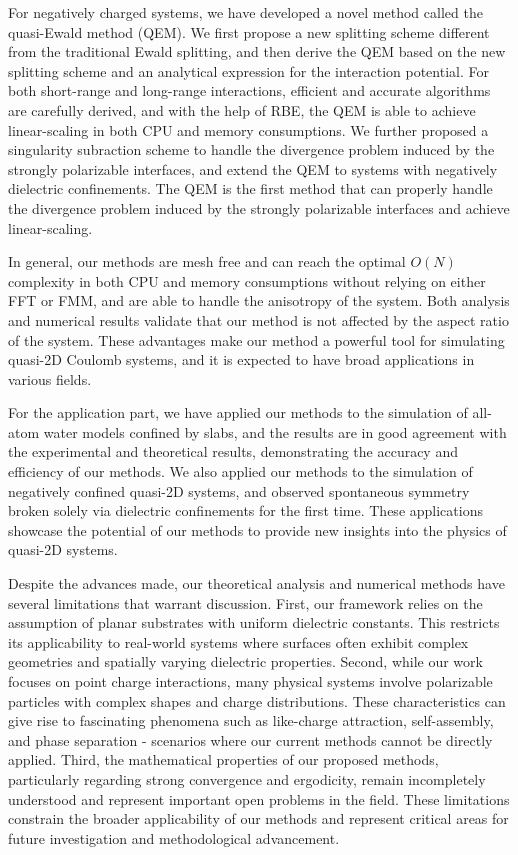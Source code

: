 For negatively charged systems, we have developed a novel method called the quasi-Ewald method (QEM).
We first propose a new splitting scheme different from the traditional Ewald splitting, and then derive the QEM based on the new splitting scheme and an analytical expression for the interaction potential.
For both short-range and long-range interactions, efficient and accurate algorithms are carefully derived, and with the help of RBE, the QEM is able to achieve linear-scaling in both CPU and memory consumptions.
We further proposed a singularity subraction scheme to handle the divergence problem induced by the strongly polarizable interfaces, and extend the QEM to systems with negatively dielectric confinements.
The QEM is the first method that can properly handle the divergence problem induced by the strongly polarizable interfaces and achieve linear-scaling.


In general, our methods are mesh free and can reach the optimal $O(N)$ complexity in both CPU and memory consumptions without relying on either FFT or FMM, and are able to handle the anisotropy of the system.
Both analysis and numerical results validate that our method is not affected by the aspect ratio of the system.
These advantages make our method a powerful tool for simulating quasi-2D Coulomb systems, and it is expected to have broad applications in various fields.

For the application part, we have applied our methods to the simulation of all-atom water models confined by slabs, and the results are in good agreement with the experimental and theoretical results, demonstrating the accuracy and efficiency of our methods.
We also applied our methods to the simulation of negatively confined quasi-2D systems, and observed spontaneous symmetry broken solely via dielectric confinements for the first time.
These applications showcase the potential of our methods to provide new insights into the physics of quasi-2D systems.

Despite the advances made, our theoretical analysis and numerical methods have several limitations that warrant discussion.
First, our framework relies on the assumption of planar substrates with uniform dielectric constants.
This restricts its applicability to real-world systems where surfaces often exhibit complex geometries and spatially varying dielectric properties.
Second, while our work focuses on point charge interactions, many physical systems involve polarizable particles with complex shapes and charge distributions.
These characteristics can give rise to fascinating phenomena such as like-charge attraction, self-assembly, and phase separation - scenarios where our current methods cannot be directly applied.
Third, the mathematical properties of our proposed methods, particularly regarding strong convergence and ergodicity, remain incompletely understood and represent important open problems in the field.
These limitations constrain the broader applicability of our methods and represent critical areas for future investigation and methodological advancement.


